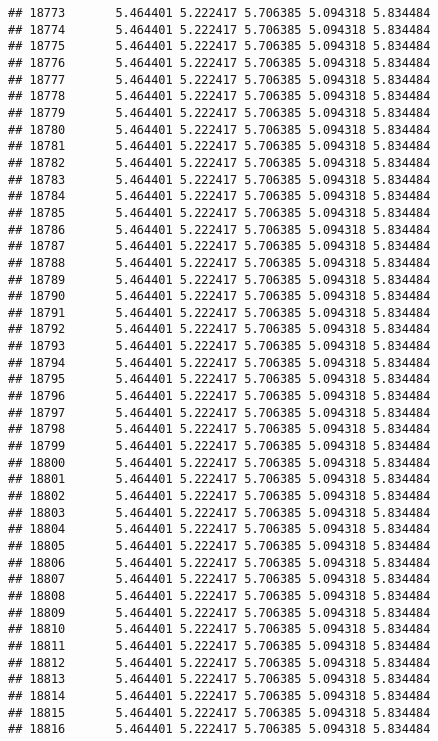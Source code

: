 \documentclass[
]{article}
\begin{document}
\begin{verbatim}
## 18773       5.464401 5.222417 5.706385 5.094318 5.834484
## 18774       5.464401 5.222417 5.706385 5.094318 5.834484
## 18775       5.464401 5.222417 5.706385 5.094318 5.834484
## 18776       5.464401 5.222417 5.706385 5.094318 5.834484
## 18777       5.464401 5.222417 5.706385 5.094318 5.834484
## 18778       5.464401 5.222417 5.706385 5.094318 5.834484
## 18779       5.464401 5.222417 5.706385 5.094318 5.834484
## 18780       5.464401 5.222417 5.706385 5.094318 5.834484
## 18781       5.464401 5.222417 5.706385 5.094318 5.834484
## 18782       5.464401 5.222417 5.706385 5.094318 5.834484
## 18783       5.464401 5.222417 5.706385 5.094318 5.834484
## 18784       5.464401 5.222417 5.706385 5.094318 5.834484
## 18785       5.464401 5.222417 5.706385 5.094318 5.834484
## 18786       5.464401 5.222417 5.706385 5.094318 5.834484
## 18787       5.464401 5.222417 5.706385 5.094318 5.834484
## 18788       5.464401 5.222417 5.706385 5.094318 5.834484
## 18789       5.464401 5.222417 5.706385 5.094318 5.834484
## 18790       5.464401 5.222417 5.706385 5.094318 5.834484
## 18791       5.464401 5.222417 5.706385 5.094318 5.834484
## 18792       5.464401 5.222417 5.706385 5.094318 5.834484
## 18793       5.464401 5.222417 5.706385 5.094318 5.834484
## 18794       5.464401 5.222417 5.706385 5.094318 5.834484
## 18795       5.464401 5.222417 5.706385 5.094318 5.834484
## 18796       5.464401 5.222417 5.706385 5.094318 5.834484
## 18797       5.464401 5.222417 5.706385 5.094318 5.834484
## 18798       5.464401 5.222417 5.706385 5.094318 5.834484
## 18799       5.464401 5.222417 5.706385 5.094318 5.834484
## 18800       5.464401 5.222417 5.706385 5.094318 5.834484
## 18801       5.464401 5.222417 5.706385 5.094318 5.834484
## 18802       5.464401 5.222417 5.706385 5.094318 5.834484
## 18803       5.464401 5.222417 5.706385 5.094318 5.834484
## 18804       5.464401 5.222417 5.706385 5.094318 5.834484
## 18805       5.464401 5.222417 5.706385 5.094318 5.834484
## 18806       5.464401 5.222417 5.706385 5.094318 5.834484
## 18807       5.464401 5.222417 5.706385 5.094318 5.834484
## 18808       5.464401 5.222417 5.706385 5.094318 5.834484
## 18809       5.464401 5.222417 5.706385 5.094318 5.834484
## 18810       5.464401 5.222417 5.706385 5.094318 5.834484
## 18811       5.464401 5.222417 5.706385 5.094318 5.834484
## 18812       5.464401 5.222417 5.706385 5.094318 5.834484
## 18813       5.464401 5.222417 5.706385 5.094318 5.834484
## 18814       5.464401 5.222417 5.706385 5.094318 5.834484
## 18815       5.464401 5.222417 5.706385 5.094318 5.834484
## 18816       5.464401 5.222417 5.706385 5.094318 5.834484

\end{verbatim}
\end{document}
